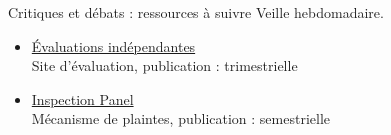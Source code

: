 \documentclass[aspectratio=169,11pt]{beamer}
\begin{document}
\begin{frame}{Critiques et débats : ressources à suivre}
\small
Veille hebdomadaire.
\begin{itemize}
\item \href{https://ieg.worldbankgroup.org}{Évaluations indépendantes}\\{\footnotesize Site d'évaluation, publication : trimestrielle}
\item \href{https://www.inspectionpanel.org}{Inspection Panel}\\{\footnotesize Mécanisme de plaintes, publication : semestrielle}
\end{itemize}
\end{frame}
\end{document}

